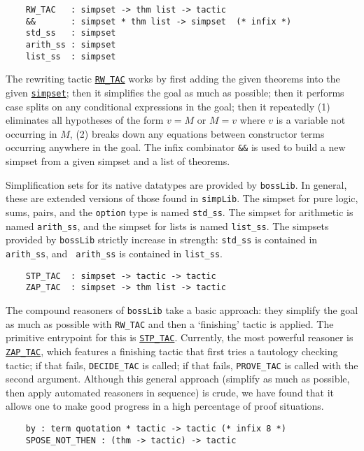 \begin{verbatim}
    RW_TAC   : simpset -> thm list -> tactic
    &&       : simpset * thm list -> simpset  (* infix *)
    std_ss   : simpset
    arith_ss : simpset
    list_ss  : simpset
\end{verbatim}

The rewriting tactic \underline{\tt RW\_TAC} works by
first adding the given theorems into the given \underline{\tt simpset}; then it
simplifies the goal as much as possible; then it performs case splits on any
conditional expressions in the goal; then it repeatedly (1) eliminates
all hypotheses of the form $v = M$ or $M = v$ where $v$ is a variable
not occurring in $M$, (2) breaks down any equations between constructor
terms occurring anywhere in the goal. The infix combinator \verb+&&+ is used to
build a new simpset from a given simpset and a list of theorems.

Simplification sets for its native datatypes are provided
by \verb+bossLib+. In general, these are extended versions of those
found in \verb+simpLib+. The simpset for pure logic, sums, pairs, and the
\verb+option+ type is named \verb+std_ss+. The simpset for arithmetic
is named \verb+arith_ss+, and the simpset for lists is named
\verb+list_ss+. The simpsets provided by {\tt bossLib} strictly increase
in strength: {\tt std\_ss} is contained in {\tt arith\_ss}, and {\tt
arith\_ss} is contained in {\tt list\_ss}.

\begin{verbatim}
    STP_TAC  : simpset -> tactic -> tactic
    ZAP_TAC  : simpset -> thm list -> tactic
\end{verbatim}

The compound reasoners of \verb+bossLib+ take a basic approach: they
simplify the goal as much as possible with \verb+RW_TAC+ and then a
`finishing' tactic is applied. The primitive entrypoint for this is
\underline{\tt STP\_TAC}. Currently, the most powerful reasoner is
\underline{\tt ZAP\_TAC}, which features a finishing tactic that first
tries a tautology checking tactic; if that fails, \verb+DECIDE_TAC+ is
called; if that fails, \verb+PROVE_TAC+ is called with the second
argument. Although this general approach (simplify as much as possible,
then apply automated reasoners in sequence) is crude, we have found that
it allows one to make good progress in a high percentage of proof
situations.

\begin{verbatim}
    by : term quotation * tactic -> tactic (* infix 8 *)
    SPOSE_NOT_THEN : (thm -> tactic) -> tactic
\end{verbatim}

